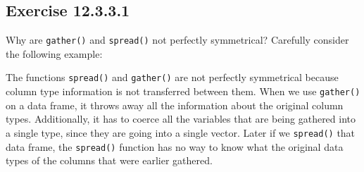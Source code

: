 \documentclass[]{book}
\newenvironment{Shaded}{\begin{snugshade}}{\end{snugshade}}
\newcommand{\CommentTok}[1]{\textcolor[rgb]{0.56,0.35,0.01}{\textit{#1}}}
\newcommand{\DataTypeTok}[1]{\textcolor[rgb]{0.13,0.29,0.53}{#1}}
\newcommand{\DecValTok}[1]{\textcolor[rgb]{0.00,0.00,0.81}{#1}}
\newcommand{\FloatTok}[1]{\textcolor[rgb]{0.00,0.00,0.81}{#1}}
\newcommand{\KeywordTok}[1]{\textcolor[rgb]{0.13,0.29,0.53}{\textbf{#1}}}
\newcommand{\NormalTok}[1]{#1}
\newcommand{\OperatorTok}[1]{\textcolor[rgb]{0.81,0.36,0.00}{\textbf{#1}}}
\newcommand{\StringTok}[1]{\textcolor[rgb]{0.31,0.60,0.02}{#1}}
\theoremstyle{plain}
\theoremstyle{remark}
\begin{document}
\hypertarget{exercise-12.3.3.1}{%
\subsection*{\texorpdfstring{Exercise
{12.3.3.1}}{Exercise 12.3.3.1}}\label{exercise-12.3.3.1}}

Why are \texttt{gather()} and \texttt{spread()} not perfectly
symmetrical? Carefully consider the following example:

\begin{Shaded}
\end{Shaded}

The functions \texttt{spread()} and \texttt{gather()} are not perfectly
symmetrical because column type information is not transferred between
them. When we use \texttt{gather()} on a data frame, it throws away all
the information about the original column types. Additionally, it has to
coerce all the variables that are being gathered into a single type,
since they are going into a single vector. Later if we \texttt{spread()}
that data frame, the \texttt{spread()} function has no way to know what
the original data types of the columns that were earlier gathered.
\end{document}
